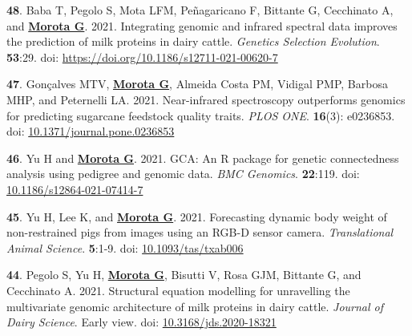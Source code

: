 \documentclass[margin,line,10pt]{res}
\newenvironment{list1}{
  \begin{list}{\ding{113}}{%
      \setlength{\itemsep}{0in}
      \setlength{\parsep}{0in} \setlength{\parskip}{0in}
      \setlength{\topsep}{0in} \setlength{\partopsep}{0in} 
      \setlength{\leftmargin}{0.17in}}}{\end{list}}
\begin{document}
\begin{resume}
\begin{list1}
    \vspace{0.5cm}

\item [{\bf 48}.] Baba T, Pegolo S, Mota LFM, Pe\~{n}agaricano F, Bittante G, Cecchinato A, and \textbf{\underline{Morota G}}. 2021. Integrating genomic and infrared spectral data improves the prediction of milk proteins in dairy cattle. \emph{Genetics Selection Evolution}. \textbf{53}:29. doi: \textcolor{blue}{\href{https://doi.org/10.1186/s12711-021-00620-7}{https://doi.org/10.1186/s12711-021-00620-7}}
  
  \vspace{0.5cm}
  
\item [{\bf 47}.] Gon\c{c}alves MTV, \textbf{\underline{Morota G}}, Almeida Costa PM, Vidigal PMP, Barbosa MHP, and Peternelli LA. 2021. Near-infrared spectroscopy outperforms genomics for predicting sugarcane feedstock quality traits.  \emph{PLOS ONE}. \textbf{16}(3): e0236853. doi: \textcolor{blue}{\href{https://doi.org/10.1371/journal.pone.0236853}{10.1371/journal.pone.0236853}}

  \vspace{0.5cm}

  \item  [{\bf 46}.] Yu H and \textbf{\underline{Morota G}}. 2021. GCA: An R package for genetic connectedness analysis using pedigree and genomic data. \emph{BMC Genomics}. \textbf{22}:119.  doi: \textcolor{blue}{\href{https://doi.org/10.1186/s12864-021-07414-7}{10.1186/s12864-021-07414-7}}

  \vspace{0.5cm}

  
\item [{\bf 45}.] Yu H, Lee K, and \textbf{\underline{Morota G}}. 2021. Forecasting dynamic body weight of non-restrained pigs from images using an RGB-D sensor camera. \emph{Translational Animal Science}. \textbf{5}:1-9. doi: \textcolor{blue}{\href{https://doi.org/10.1093/tas/txab006}{10.1093/tas/txab006}} 

  \vspace{0.5cm}
  
\item [{\bf 44}.] Pegolo S, Yu H, \textbf{\underline{Morota G}}, Bisutti V, Rosa GJM, Bittante G, and Cecchinato A. 2021. Structural equation modelling for unravelling the multivariate genomic architecture of milk proteins in dairy cattle. \emph{Journal of Dairy Science}. Early view.  doi: \textcolor{blue}{\href{https://doi.org/10.3168/jds.2020-18321}{10.3168/jds.2020-18321}} 


\end{list1}
\end{resume}
\end{document}
